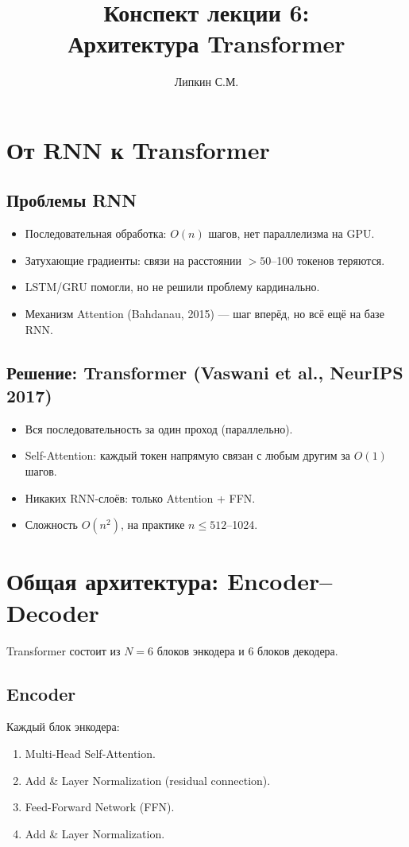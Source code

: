 \documentclass[a4paper,12pt]{article}
\title{Конспект лекции 6: \\ Архитектура Transformer}
\author{Липкин С.М.}
\date{}
\begin{document}
\maketitle

\section{От RNN к Transformer}

\subsection{Проблемы RNN}
\begin{itemize}
    \item Последовательная обработка: $O(n)$ шагов, нет параллелизма на GPU.
    \item Затухающие градиенты: связи на расстоянии $> 50$--100 токенов теряются.
    \item LSTM/GRU помогли, но не решили проблему кардинально.
    \item Механизм Attention (Bahdanau, 2015) — шаг вперёд, но всё ещё на базе RNN.
\end{itemize}

\subsection{Решение: Transformer (Vaswani et al., NeurIPS 2017)}
\begin{itemize}
    \item Вся последовательность за один проход (параллельно).
    \item Self-Attention: каждый токен напрямую связан с любым другим за $O(1)$ шагов.
    \item Никаких RNN-слоёв: только Attention + FFN.
    \item Сложность $O(n^2)$, на практике $n \le 512$--1024.
\end{itemize}

\section{Общая архитектура: Encoder--Decoder}

Transformer состоит из $N = 6$ блоков энкодера и 6 блоков декодера.

\subsection{Encoder}
Каждый блок энкодера:
\begin{enumerate}
    \item Multi-Head Self-Attention.
    \item Add \& Layer Normalization (residual connection).
    \item Feed-Forward Network (FFN).
    \item Add \& Layer Normalization.
\end{enumerate}
\end{document}
